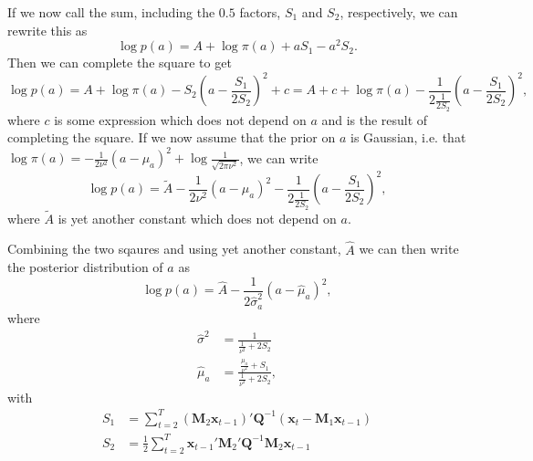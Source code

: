 \documentclass[a4paper,12pt]{article} %
\newcommand{\bx}{\bm{x}}
\newcommand{\bM}{\bm{M}}
\newcommand{\bQ}{\bm{Q}}
\begin{document}
If we now call the sum, including the $0.5$ factors, $S_1$ and $S_2$, respectively, we can rewrite this as
$$
\log p(a) = A + \log \pi(a) + a S_1 - a^2 S_2.  
$$
Then we can complete the square to get
$$
\log p(a) = A + \log \pi(a) - S_2\left(a - \frac{S_1}{2S_2}\right)^2 + c = A+c + \log\pi(a) - \frac{1}{2\frac{1}{2S_2}}\left(a - \frac{S_1}{2S_2}\right)^2,
$$
where $c$ is some expression which does not depend on $a$ and is the result of completing the square.
If we now assume that the prior on $a$ is Gaussian, i.e. that $\log \pi(a) = -\frac{1}{2\nu^2}(a - \mu_a)^2 + \log \frac{1}{\sqrt{2\pi\nu^2}}$, we can write
$$
\log p(a) = \tilde{A} -\frac{1}{2\nu^2}(a - \mu_a)^2 - \frac{1}{2\frac{1}{2S_2}}\left(a - \frac{S_1}{2S_2}\right)^2,
$$
where $\tilde{A}$ is yet another constant which does not depend on $a$.

Combining the two sqaures and using yet another constant, $\hat{A}$ we can then write the posterior distribution of $a$ as
$$
\log p(a) = \hat{A} - \frac{1}{2\hat{\sigma}^2_a} \left(a - \hat{\mu}_a\right)^2,
$$
where
\begin{align*}
  \hat{\sigma}^2 &= \frac{1}{\frac{1}{\nu^2} + 2S_2} \\
  \hat{\mu}_a &= \frac{\frac{\mu_a}{\nu^2} +S_1}{\frac{1}{\nu^2} + 2S_2},
\end{align*}
with
\begin{align}
  S_1 &= \sum_{t=2}^T \left(\bM_2\bx_{t-1}\right)'\bQ^{-1}\left(\bx_t - \bM_1\bx_{t-1}\right)\\
  S_2 &= \frac{1}{2}\sum_{t=2}^T \bx_{t-1}'\bM_2'\bQ^{-1}\bM_2\bx_{t-1}
  \end{align}
\end{document}
